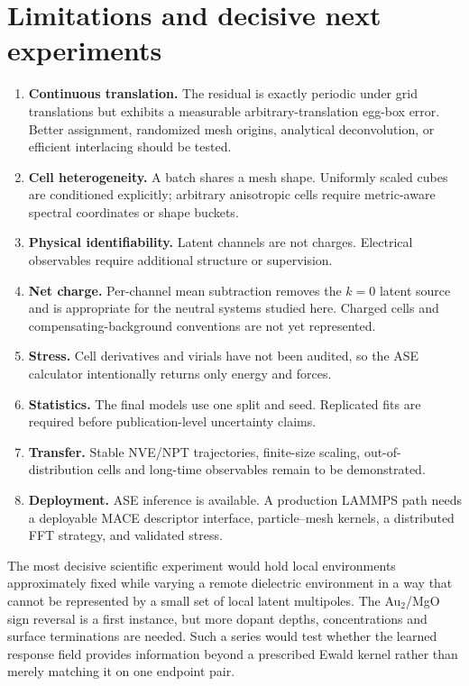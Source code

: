 \documentclass[11pt]{article}
\begin{document}
\section{Limitations and decisive next experiments}

\begin{enumerate}
 \item \textbf{Continuous translation.} The residual is exactly periodic
 under grid translations but exhibits a measurable arbitrary-translation
 egg-box error. Better assignment, randomized mesh origins, analytical
 deconvolution, or efficient interlacing should be tested.
 \item \textbf{Cell heterogeneity.} A batch shares a mesh shape. Uniformly
 scaled cubes are conditioned explicitly; arbitrary anisotropic cells require
 metric-aware spectral coordinates or shape buckets.
 \item \textbf{Physical identifiability.} Latent channels are not charges.
 Electrical observables require additional structure or supervision.
 \item \textbf{Net charge.} Per-channel mean subtraction removes the
 \(k=0\) latent source and is appropriate for the neutral systems studied
 here. Charged cells and compensating-background conventions are not yet
 represented.
 \item \textbf{Stress.} Cell derivatives and virials have not been audited,
 so the ASE calculator intentionally returns only energy and forces.
 \item \textbf{Statistics.} The final models use one split and seed.
 Replicated fits are required before publication-level uncertainty claims.
 \item \textbf{Transfer.} Stable NVE/NPT trajectories,
 finite-size scaling, out-of-distribution cells and long-time observables
 remain to be demonstrated.
 \item \textbf{Deployment.} ASE inference is available. A production LAMMPS
 path needs a deployable MACE descriptor interface, particle--mesh kernels,
 a distributed FFT strategy, and validated stress.
\end{enumerate}

The most decisive scientific experiment would hold local environments
approximately fixed while varying a remote dielectric environment in a way
that cannot be represented by a small set of local latent multipoles. The
Au$_2$/MgO sign reversal is a first instance, but more dopant depths,
concentrations and surface terminations are needed. Such a series would test
whether the learned response field provides information beyond a prescribed
Ewald kernel rather than merely matching it on one endpoint pair.
\end{document}
